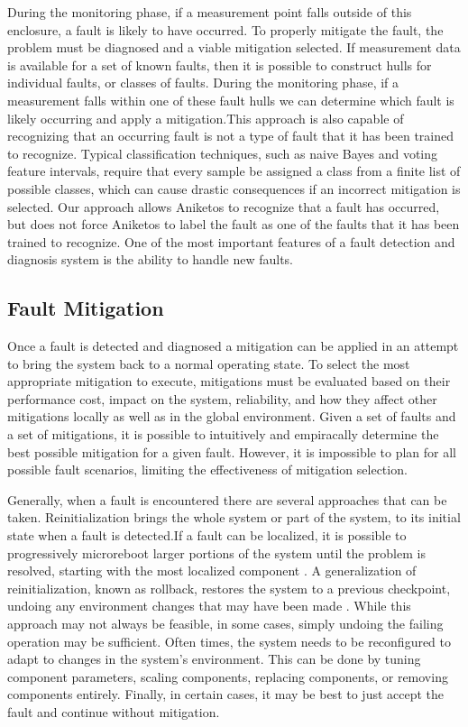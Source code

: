 During the monitoring phase, if a measurement point falls outside of this
enclosure, a fault is likely to have occurred. To properly mitigate the fault,
the problem must be diagnosed \cite{6100108} and a viable mitigation
selected. If measurement data is available for a set of known faults, then it
is possible to construct hulls for individual faults, or classes of
faults. During the monitoring phase, if a measurement falls within one of these
fault hulls we can determine which fault is likely occurring and apply a
mitigation.This approach is also capable of recognizing that an occurring fault
is not a type of fault that it has been trained to recognize. Typical
classification techniques, such as naive Bayes and voting feature
intervals\cite{Demiroz1997}, require that every sample be assigned a class from
a finite list of possible classes, which can cause drastic consequences if an
incorrect mitigation is selected. Our approach allows Aniketos to recognize
that a fault has occurred, but does not force Aniketos to label the fault as
one of the faults that it has been trained to recognize. One of the most
important features of a fault detection and diagnosis system is the ability to
handle new faults.

\subsection{Fault Mitigation}
\label{sub:fault_mitigation}
Once a fault is detected and diagnosed a mitigation can be applied in an
attempt to bring the system back to a normal operating state. To select the
most appropriate mitigation to execute, mitigations must be evaluated based on
their performance cost, impact on the system, reliability, and how they affect
other mitigations locally as well as in the global environment. Given a set of
faults and a set of mitigations, it is possible to intuitively and empiracally
determine the best possible mitigation for a given fault. However, it is
impossible to plan for all possible fault scenarios, limiting the effectiveness
of mitigation selection.

Generally, when a fault is encountered there are several approaches that can be
taken. Reinitialization brings the whole system or part of the system, to its
initial state when a fault is detected.If a fault can be localized, it is
possible to progressively microreboot larger portions of the system until the
problem is resolved, starting with the most localized component
\cite{1251257}. A generalization of reinitialization, known as rollback,
restores the system to a previous checkpoint, undoing any environment changes
that may have been made \cite{1095833}. While this approach may not always be
feasible, in some cases, simply undoing the failing operation may be
sufficient. Often times, the system needs to be reconfigured to adapt to
changes in the system's environment. This can be done by tuning component
parameters, scaling components, replacing components, or removing components
entirely. Finally, in certain cases, it may be best to just accept the fault
and continue without mitigation.

